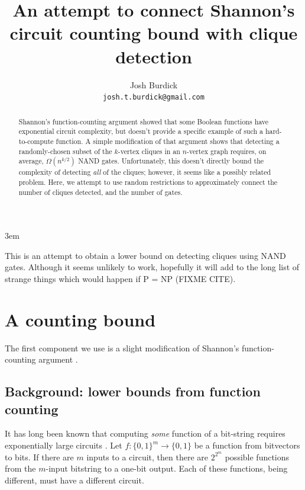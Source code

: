 \documentclass[12pt]{article}
\theoremstyle{definition}
\begin{document}
\emergencystretch 3em
\title{
An attempt to connect Shannon's
circuit counting bound with clique detection}

\author{Josh Burdick \\
{\tt josh.t.burdick@gmail.com}}
\maketitle

\begin{abstract}
Shannon's function-counting argument
\cite{shannon_synthesis_1949} showed that some Boolean functions have
exponential circuit complexity, but doesn't provide a specific example
of such a hard-to-compute function. A simple modification of that argument
shows that detecting a randomly-chosen subset of the $k$-vertex cliques in an
$n$-vertex graph requires, on average, $\Omega(n^{k/2})$ NAND gates.
Unfortunately,
this doesn't directly bound the complexity of detecting {\em all} of the cliques; however, it seems like a
possibly related problem.
Here, we attempt to use random restrictions to approximately
connect the number of cliques detected, and the number of gates.
\end{abstract}

\newpage

\tableofcontents

This is an attempt to obtain a lower bound on detecting cliques
using NAND gates. Although it seems unlikely to work, hopefully
it will add to the long list of strange things which would happen
if P = NP (FIXME CITE).

\section{A counting bound}
\label{countingBound}

The first component we use is a slight modification
of Shannon's function-counting argument
\cite{shannon_synthesis_1949}.

\subsection{Background: lower bounds from function counting}

It has long been known that computing {\em some} function of a bit-string
requires exponentially large circuits \cite{shannon_synthesis_1949}.
Let $f: \{0,1\}^m \rightarrow \{0,1\}$ be a function from bitvectors to bits.
If there are $m$ inputs to a circuit,
then there are $2^{2^m}$ possible functions from the $m$-input bitstring to
a one-bit output. Each of these functions, being different, must have a
different circuit.
\end{document}
